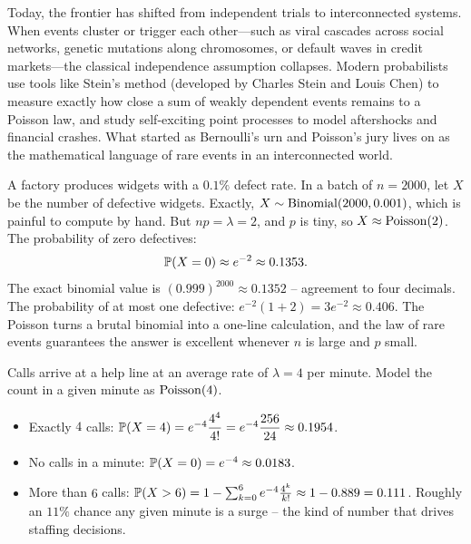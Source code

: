 \begin{historybox}
Today, the frontier has shifted from independent trials to interconnected
systems. When events cluster or trigger each other---such as viral cascades across
social networks, genetic mutations along chromosomes, or default waves in credit
markets---the classical independence assumption collapses. Modern probabilists
use tools like Stein's method (developed by Charles Stein and Louis Chen) to
measure exactly how close a sum of weakly dependent events remains to a Poisson
law, and study self-exciting point processes to model aftershocks and financial
crashes. What started as Bernoulli's urn and Poisson's jury lives on as the
mathematical language of rare events in an interconnected world.
\end{historybox}

\begin{example}
\label{ch07:ex-poisapprox}
A factory produces widgets with a $0.1\%$ defect rate. In a batch of $n = 2000$,
let $X$ be the number of defective widgets. Exactly, $X \sim \Bin(2000, 0.001)$,
which is painful to compute by hand. But $np = \lambda = 2$, and $p$ is tiny, so
$X \approx \Pois(2)$. The probability of zero defectives:
\[
  \P(X = 0) \approx e^{-2} \approx 0.1353.
\]
The exact binomial value is $(0.999)^{2000} \approx 0.1352$ -- agreement to four
decimals. The probability of at most one defective:
$e^{-2}(1 + 2) = 3e^{-2} \approx 0.406$. The Poisson turns a brutal binomial into
a one-line calculation, and the law of rare events guarantees the answer is
excellent whenever $n$ is large and $p$ small.
\end{example}

\begin{example}
\label{ch07:ex-callcenter}
Calls arrive at a help line at an average rate of $\lambda = 4$ per minute. Model
the count in a given minute as $\Pois(4)$.
\begin{itemize}
\item Exactly $4$ calls: $\P(X=4) = e^{-4}\dfrac{4^4}{4!}
  = e^{-4}\dfrac{256}{24} \approx 0.1954$.
\item No calls in a minute: $\P(X = 0) = e^{-4} \approx 0.0183$.
\item More than $6$ calls: $\P(X > 6) = 1 - \sum_{k=0}^{6} e^{-4}\frac{4^k}{k!}
  \approx 1 - 0.889 = 0.111$. Roughly an $11\%$ chance any given minute is a
  surge -- the kind of number that drives staffing decisions.
\end{itemize}
\end{example}

